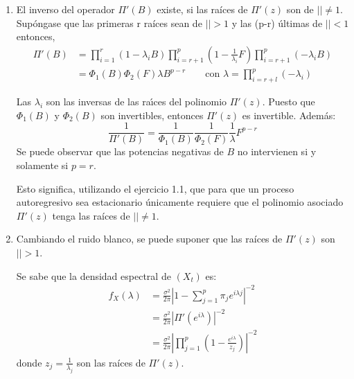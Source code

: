 \begin{observacion}
\quad
\begin{enumerate}
\item El inverso del operador $\Pi'(B)$ existe, si las ra\'{i}ces de $\Pi'(z)$ son de $\left| \right|\ne 1$. Sup\'{o}ngase que las primeras r ra\'{i}ces sean de $\left| \right|>1$ y las (p-r) \'{u}ltimas de $\left| \right|<1$
entonces, 
\begin{align*}
 \Pi'(B)
	 &=\prod_{i=1}^{r} (1-\lambda_{i} B)\prod_{i=r+1}^{p} \left( {1-\frac{1}{\lambda_{i} }F} \right)\prod_{i=r+1}^{p} (-\lambda_{i} B)\\
	 &=\Phi_{1} \left( B \right)\Phi_{2} (F)\lambda B^{p-r}\qquad\text{con }\lambda 
=\prod_{i=r+l}^{p} \left( {-\lambda_{i} } \right)
\end{align*}

Las $\lambda_{i}$ son las inversas de las ra\'{\i}ces del polinomio 
${\Pi }'\left( z \right)$. Puesto que $\Phi_{1} (B)$ y $\Phi_{2} 
(B)$ son invertibles, entonces $\Pi'(z)$ es invertible. Adem\'{a}s:
\[
\frac{1}{\Pi'(B)}=\frac{1}{\Phi_{1} (B)}\frac{1}{\Phi_{2} 
(F)}\frac{1}{\lambda }F^{p-r}
\]
Se puede observar que las potencias negativas de $B$ no intervienen si y solamente si $p=r$.\newline

Esto significa, utilizando el ejercicio 1.1, que para que un proceso autoregresivo sea estacionario \'{u}nicamente requiere que el polinomio asociado ${\Pi }'\left( z \right)$ tenga las ra\'{i}ces de $\left| \right|\ne 1$.

\item Cambiando el ruido blanco, se puede suponer que las ra\'{i}ces de $\Pi'(z)$ son $\left| \right|>1$.\newline

Se sabe que la densidad espectral de $(X_{{t}})$ es:
\begin{align*}
 f_{X} (\lambda )
	 &=\frac{\sigma^{2}}{2\pi }\left| {1-\sum_{j=1}^p {\pi_{j} e^{i\lambda j}} } \right|^{-2}\\
	 &=\frac{\sigma ^{2}}{2\pi }\left| {\Pi'(e^{i\lambda })} \right|^{-2}\\
	 &=\frac{\sigma^{2}}{2\pi }\left| {\prod_{j=1}^{p} \left({1-\frac{e^{i\lambda }}{z_{j} }} \right)} \right|^{-2}
\end{align*}
donde $z_{j} =\frac{1}{\lambda_{j} }$ son las ra\'{i}ces de $\Pi'(z)$.\newline


\end{enumerate}
\end{observacion}
